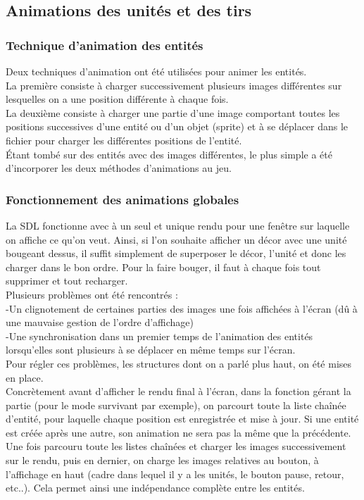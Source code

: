 \documentclass[a4paper,11pt]{article}
\begin{document}
\subsection{Animations des unités et des tirs}
\subsubsection{Technique d'animation des entités}
Deux techniques d'animation ont été utilisées pour animer les entités.\\ La première consiste à charger successivement plusieurs images différentes sur lesquelles on a une position différente à chaque fois.\\ La deuxième consiste à charger une partie d'une image comportant toutes les positions successives d'une entité ou d'un objet (sprite) et à se déplacer dans le fichier pour charger les différentes positions de l'entité.\\ Étant tombé sur des entités avec des images différentes, le plus simple a été d'incorporer les deux méthodes d'animations au jeu.

\subsubsection{Fonctionnement des animations globales}
La SDL fonctionne avec à un seul et unique rendu pour une fenêtre sur laquelle on affiche ce qu'on veut. Ainsi, si l'on souhaite afficher un décor avec une unité bougeant dessus, il suffit simplement de superposer le décor, l'unité et donc les charger dans le bon ordre. Pour la faire bouger, il faut à chaque fois tout supprimer et tout recharger. \\ Plusieurs problèmes ont été rencontrés :\\ -Un clignotement de certaines parties des images une fois affichées à l'écran (dû à une mauvaise gestion de l'ordre d'affichage)\\ -Une synchronisation dans un premier temps de l'animation des entités lorsqu'elles sont plusieurs à se déplacer en même temps sur l'écran.\\

Pour régler ces problèmes, les structures dont on a parlé plus haut, on été mises en place. \\ Concrètement avant d'afficher le rendu final à l'écran, dans la fonction gérant la partie (pour le mode survivant par exemple), on parcourt toute la liste chaînée d'entité, pour laquelle chaque position est enregistrée et mise à jour. Si une entité est créée après une autre, son animation ne sera pas la même que la précédente. Une fois parcouru toute les listes chaînées et charger les images successivement sur le rendu, puis en dernier, on charge les images relatives au bouton, à l'affichage en haut (cadre dans lequel il y a les unités, le bouton pause, retour, etc..). Cela permet ainsi une indépendance complète entre les entités.
\end{document}
